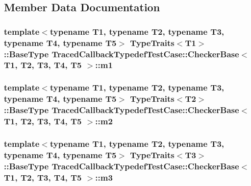 \subsection{Member Data Documentation}
\subsubsection[{\texorpdfstring{m1}{m1}}]{\setlength{\rightskip}{0pt plus 5cm}template$<$typename T1, typename T2, typename T3, typename T4, typename T5$>$ {\bf Type\+Traits}$<$T1$>$\+::Base\+Type {\bf Traced\+Callback\+Typedef\+Test\+Case\+::\+Checker\+Base}$<$ T1, T2, T3, T4, T5 $>$\+::m1}\hypertarget{classTracedCallbackTypedefTestCase_1_1CheckerBase_a98f287e2e2d5ffcaae0d995203474530}{}\label{classTracedCallbackTypedefTestCase_1_1CheckerBase_a98f287e2e2d5ffcaae0d995203474530}
\subsubsection[{\texorpdfstring{m2}{m2}}]{\setlength{\rightskip}{0pt plus 5cm}template$<$typename T1, typename T2, typename T3, typename T4, typename T5$>$ {\bf Type\+Traits}$<$T2$>$\+::Base\+Type {\bf Traced\+Callback\+Typedef\+Test\+Case\+::\+Checker\+Base}$<$ T1, T2, T3, T4, T5 $>$\+::m2}\hypertarget{classTracedCallbackTypedefTestCase_1_1CheckerBase_a7e8752868bfda72ec0eac73e91f3742f}{}\label{classTracedCallbackTypedefTestCase_1_1CheckerBase_a7e8752868bfda72ec0eac73e91f3742f}
\subsubsection[{\texorpdfstring{m3}{m3}}]{\setlength{\rightskip}{0pt plus 5cm}template$<$typename T1, typename T2, typename T3, typename T4, typename T5$>$ {\bf Type\+Traits}$<$T3$>$\+::Base\+Type {\bf Traced\+Callback\+Typedef\+Test\+Case\+::\+Checker\+Base}$<$ T1, T2, T3, T4, T5 $>$\+::m3}\hypertarget{classTracedCallbackTypedefTestCase_1_1CheckerBase_a3c03c3cb843029393002cb8ad318b61a}{}\label{classTracedCallbackTypedefTestCase_1_1CheckerBase_a3c03c3cb843029393002cb8ad318b61a}
